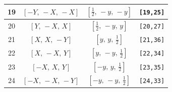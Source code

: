 \documentclass[fleqn,8pt]{jsarticle}
\begin{document}
\begin{longtable}{cccc}
19 & $\left[ - Y,\, - X,\, - X \right]$ & $\left[ \frac{1}{2},\, - y,\, - y \right]$ & {\tt [19,25]} \\ \hline
20 & $\left[ Y,\, - X,\, X \right]$ & $\left[ \frac{1}{2},\, - y,\, y \right]$ & {\tt [20,27]} \\ \hline
21 & $\left[ X,\, X,\, - Y \right]$ & $\left[ y,\, y,\, \frac{1}{2} \right]$ & {\tt [21,36]} \\ \hline
22 & $\left[ X,\, - X,\, Y \right]$ & $\left[ y,\, - y,\, \frac{1}{2} \right]$ & {\tt [22,34]} \\ \hline
23 & $\left[ - X,\, X,\, Y \right]$ & $\left[ - y,\, y,\, \frac{1}{2} \right]$ & {\tt [23,35]} \\ \hline
24 & $\left[ - X,\, - X,\, - Y \right]$ & $\left[ - y,\, - y,\, \frac{1}{2} \right]$ & {\tt [24,33]} \\
\end{longtable}
\renewcommand{\arraystretch}{1.2}
\end{document}
